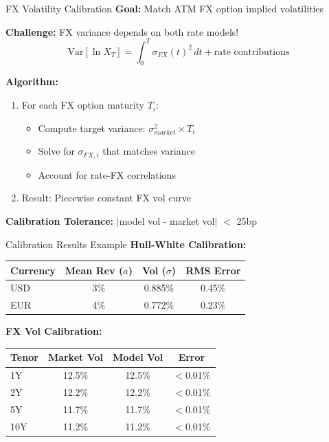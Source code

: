 \documentclass[aspectratio=169,11pt]{beamer}
\begin{document}
\begin{frame}{FX Volatility Calibration}
\textbf{Goal:} Match ATM FX option implied volatilities

\textbf{Challenge:} FX variance depends on both rate models!
\[
\text{Var}[\ln X_T] = \int_0^T \sigma_{FX}(t)^2\, dt + \text{rate contributions}
\]

\textbf{Algorithm:}
\begin{enumerate}
    \item For each FX option maturity $T_i$:
    \begin{itemize}
        \item Compute target variance: $\sigma_{market}^2 \times T_i$
        \item Solve for $\sigma_{FX,i}$ that matches variance
        \item Account for rate-FX correlations
    \end{itemize}
    \item Result: Piecewise constant FX vol curve
\end{enumerate}

\textbf{Calibration Tolerance:} $|$model vol - market vol$|$ $<$ 25bp
\end{frame}

\begin{frame}{Calibration Results Example}
\textbf{Hull-White Calibration:}
\begin{center}
\begin{tabular}{lccc}
\toprule
Currency & Mean Rev ($a$) & Vol ($\sigma$) & RMS Error \\
\midrule
USD & 3\% & 0.885\% & 0.45\% \\
EUR & 4\% & 0.772\% & 0.23\% \\
\bottomrule
\end{tabular}
\end{center}

\textbf{FX Vol Calibration:}
\begin{center}
\begin{tabular}{lccc}
\toprule
Tenor & Market Vol & Model Vol & Error \\
\midrule
1Y & 12.5\% & 12.5\% & $<$0.01\% \\
2Y & 12.2\% & 12.2\% & $<$0.01\% \\
5Y & 11.7\% & 11.7\% & $<$0.01\% \\
10Y & 11.2\% & 11.2\% & $<$0.01\% \\
\bottomrule
\end{tabular}
\end{center}
\end{frame}
\end{document}
